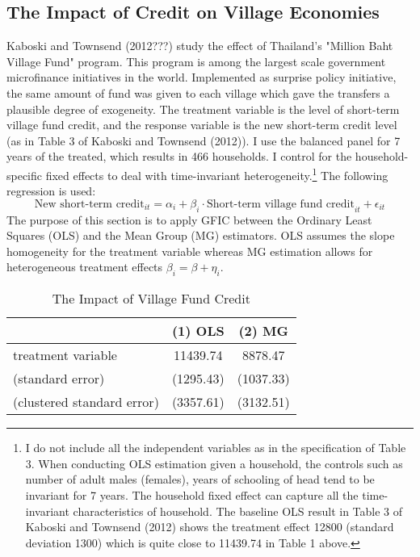 \subsection{The Impact of Credit on Village Economies}
\label{sec:townsend}

Kaboski and Townsend (2012???) study the effect of Thailand's "Million Baht Village Fund" program. 
This program is among the largest scale government microfinance initiatives in the world. 
Implemented as surprise policy initiative, the same amount of fund was given to each village which gave the transfers a plausible degree of exogeneity.
The treatment variable is the level of short-term village fund credit, and the response variable is the new short-term credit level (as in Table 3 of Kaboski and Townsend (2012)). 
I use the balanced panel for 7 years of the treated, which results in 466 households. 
I control for the household-specific fixed effects to deal with time-invariant heterogeneity.\footnote{I do not include all the independent variables as in the specification of Table 3. When conducting OLS estimation given a household, the controls such as number of adult males (females), years of schooling of head tend to be invariant for 7 years. The household fixed effect can capture all the time-invariant characteristics of household. The baseline OLS result in Table 3 of Kaboski and Townsend (2012) shows the treatment effect 12800 (standard deviation 1300) which is quite close to 11439.74 in Table 1 above.} 
The following regression is used:    
\[
\text{New short-term credit}_{it} = \alpha_i + \beta_i \cdot \text{Short-term village fund credit}_{it} + \epsilon_{it}
\]
The purpose of this section is to apply GFIC between the Ordinary Least Squares (OLS) and the Mean Group (MG) estimators. 
OLS assumes the slope homogeneity for the treatment variable whereas MG estimation allows for heterogeneous treatment effects $\beta_i = \beta + \eta_i$.  
    
\begin{table}[htbp]\centering
\caption{The Impact of Village Fund Credit}
\begin{tabular}{l  c c  }
\hline
\hline
& (1) OLS & (2) MG\\ \hline
treatment variable  &  11439.74 & 8878.47\\
(standard error) & (1295.43) &  (1037.33)\\
(clustered standard error) & (3357.61)& (3132.51)\\
\hline
\hline
\end{tabular}
\end{table}

